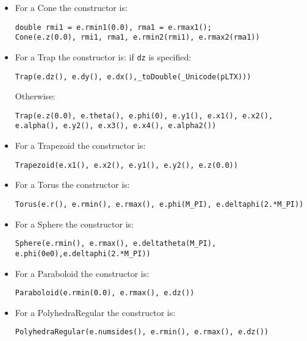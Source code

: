 \begin{itemize}
\item For a Cone the constructor is:
\begin{verbatim}
double rmi1 = e.rmin1(0.0), rma1 = e.rmax1();
Cone(e.z(0.0), rmi1, rma1, e.rmin2(rmi1), e.rmax2(rma1))
\end{verbatim}

\item For a Trap the constructor is: if \texttt{dz} is specified: 
\begin{verbatim}
Trap(e.dz(), e.dy(), e.dx(),_toDouble(_Unicode(pLTX)))
\end{verbatim}
Otherwise: 
\begin{verbatim}
Trap(e.z(0.0), e.theta(), e.phi(0), e.y1(), e.x1(), e.x2(), e.alpha(), e.y2(), e.x3(), e.x4(), e.alpha2())
\end{verbatim}
\item For a Trapezoid the constructor is:
\begin{verbatim}
Trapezoid(e.x1(), e.x2(), e.y1(), e.y2(), e.z(0.0))
\end{verbatim}
\item For a Torus the constructor is:
\begin{verbatim}
Torus(e.r(), e.rmin(), e.rmax(), e.phi(M_PI), e.deltaphi(2.*M_PI))
\end{verbatim}
\item For a Sphere the constructor is:
\begin{verbatim}
Sphere(e.rmin(), e.rmax(), e.deltatheta(M_PI), e.phi(0e0),e.deltaphi(2.*M_PI))
\end{verbatim}
\item For a Paraboloid the constructor is:
\begin{verbatim}
Paraboloid(e.rmin(0.0), e.rmax(), e.dz())
\end{verbatim}
\item For a PolyhedraRegular the constructor is:
\begin{verbatim}
PolyhedraRegular(e.numsides(), e.rmin(), e.rmax(), e.dz())
\end{verbatim}
\end{itemize}

